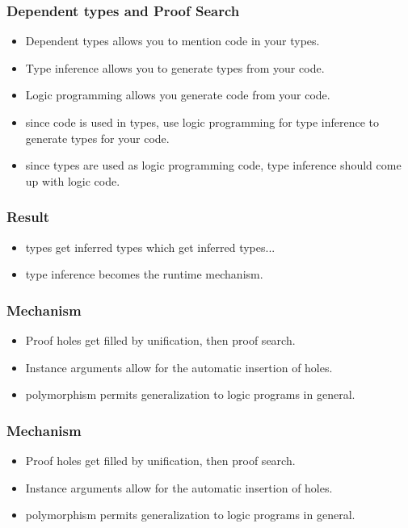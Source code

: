 
\begin{frame}
\frametitle{Dependent types and Proof Search}
\begin{itemize}

\item Dependent types allows you to mention code in your types.
\item Type inference allows you to generate types from your code.
\item Logic programming allows you generate code from your code.
\item since code is used in types, use logic programming for type inference to generate types for your code.
\item since types are used as logic programming code, type inference should come up with logic code.

\end{itemize}
\end{frame}


\begin{frame}
\frametitle{Result}
\begin{itemize}

\item types get inferred types which get inferred types... 
\item type inference becomes the runtime mechanism.

\end{itemize}
\end{frame}


\begin{frame}
\frametitle{Mechanism}
\begin{itemize}

\item Proof holes get filled by unification, then proof search.
\item Instance arguments allow for the automatic insertion of holes.
\item polymorphism permits generalization to logic programs in general.

\end{itemize}
\end{frame}


\begin{frame}
\frametitle{Mechanism}
\begin{itemize}

\item Proof holes get filled by unification, then proof search.
\item Instance arguments allow for the automatic insertion of holes.
\item polymorphism permits generalization to logic programs in general.

\end{itemize}
\end{frame}

